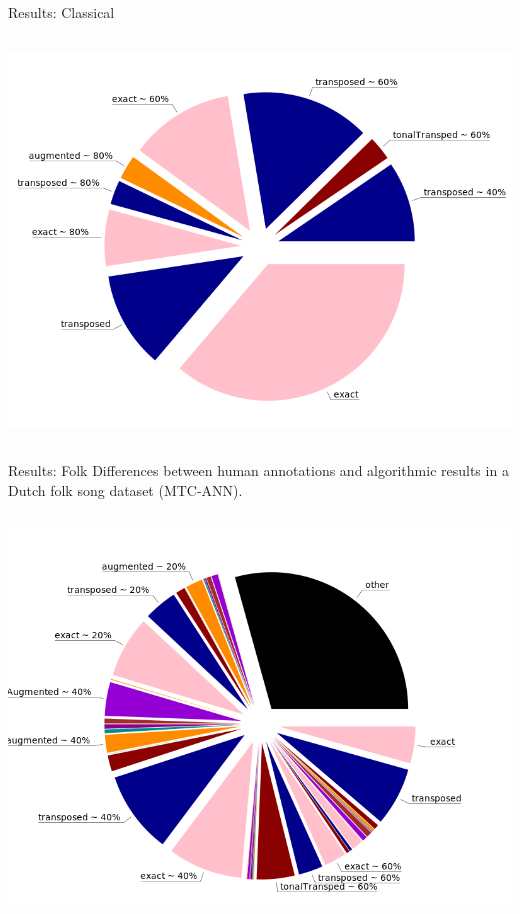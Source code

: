 \documentclass[final]{beamer}
\begin{document}
\begin{frame}[label={sec:orgd59d0ad},fragile]{}
\begin{columns}
\begin{column}[t]{0.47\columnwidth}
\begin{block}{Results: Classical}
\begin{columns}
\begin{column}[T]{0.50\columnwidth}
\begin{center}
\includegraphics[width=.9\linewidth]{./img/ce.png}
\end{center}
\end{column}
\end{columns}
\end{block}

\begin{block}{Results: Folk}
Differences between human annotations and algorithmic results in a Dutch folk song dataset (MTC-ANN).
\begin{columns}
\begin{column}[T]{0.50\columnwidth}
\begin{center}
\includegraphics[width=.9\linewidth]{./img/fa.png}
\end{center}
\end{column}


\end{columns}
\end{block}
\end{column}
\end{columns}
\end{frame}
\end{document}

